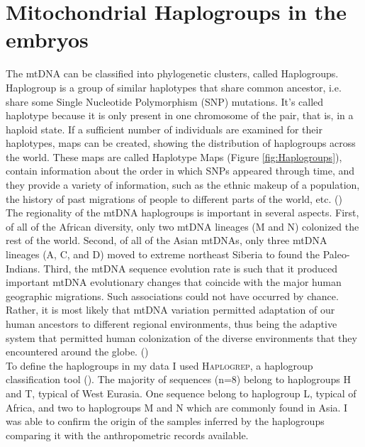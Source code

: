 \newpage
\section{Mitochondrial Haplogroups in the embryos }
The mtDNA can be classified into phylogenetic clusters, called Haplogroups.
Haplogroup is a group of similar haplotypes that share common ancestor, i.e. share some Single Nucleotide Polymorphism (SNP) mutations. It's called haplotype because it is only present in one chromosome of the pair, that is, in a haploid state. If a sufficient number of individuals are examined for their haplotypes, maps can be created, showing the distribution of haplogroups across the world. These maps are called Haplotype Maps (Figure \ref{fig:Haplogroups}), contain information about the order in which SNPs appeared through time, and they provide a variety of information, such as the ethnic makeup of a population, the history of past migrations of people to different parts of the world, etc. (\cite{arora2015hgsdb})\\
The regionality of the mtDNA haplogroups is important in several aspects. First, of all of the African diversity, only two mtDNA lineages (M and N) colonized the rest of the world. Second, of all of the Asian mtDNAs, only three mtDNA lineages (A, C, and D) moved to extreme northeast Siberia to found the Paleo-Indians. Third, the mtDNA sequence evolution rate is such that it produced important mtDNA evolutionary changes that coincide with the major human geographic migrations. Such associations could not have occurred by chance. Rather, it is most likely that mtDNA variation permitted adaptation of our human ancestors to different regional environments, thus being the adaptive system that permitted human colonization of the diverse environments that they encountered around the globe. (\cite{wallace2013mitochondrial})\\
To define the haplogroups in my data I used \textsc{Haplogrep}, a haplogroup classification tool (\cite{weissensteiner2016haplogrep}). The majority of sequences (n=8) belong to haplogroups H and T, typical of West Eurasia. One sequence belong to haplogroup L, typical of Africa, and two to haplogroups M and N which are commonly found in Asia. I was able to confirm the origin of the samples inferred by the haplogroups comparing it with the anthropometric records available.   



